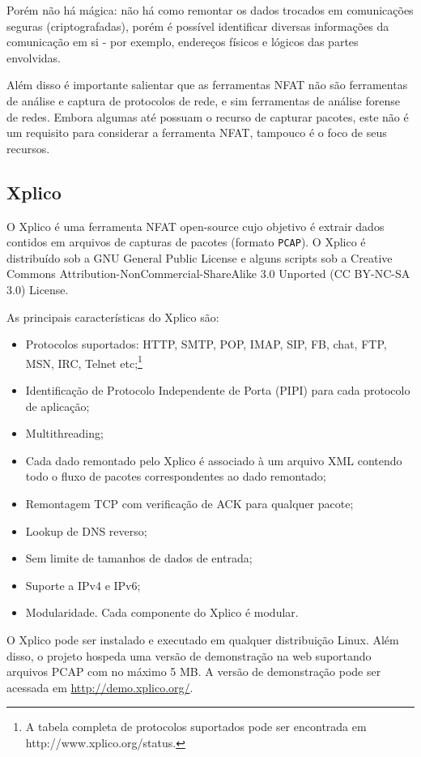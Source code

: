 \documentclass[12pt]{article}
\begin{document}
Porém não há mágica: não há como remontar os dados trocados em comunicações seguras (criptografadas), porém é possível identificar diversas informações da comunicação em si - por exemplo, endereços físicos e lógicos das partes envolvidas.

Além disso é importante salientar que as ferramentas NFAT não são ferramentas de análise e captura de protocolos de rede, e sim ferramentas de análise forense de redes. Embora algumas até possuam o recurso de capturar pacotes, este não é um requisito para considerar a ferramenta NFAT, tampouco é o foco de seus recursos.

\subsection{Xplico}

O Xplico é uma ferramenta NFAT open-source cujo objetivo é extrair dados contidos em arquivos de capturas de pacotes (formato \texttt{PCAP}). O Xplico é distribuído sob a GNU General Public License e alguns scripts sob a Creative Commons Attribution-NonCommercial-ShareAlike 3.0 Unported (CC BY-NC-SA 3.0) License.

As principais características do Xplico são:

\begin{itemize}
  \item Protocolos suportados: HTTP, SMTP, POP, IMAP, SIP, FB, chat, FTP, MSN, IRC, Telnet etc;\footnote{A tabela completa de protocolos suportados pode ser encontrada em http://www.xplico.org/status.}
  \item Identificação de Protocolo Independente de Porta (PIPI) para cada protocolo de aplicação;
  \item Multithreading;
  \item Cada dado remontado pelo Xplico é associado à um arquivo XML contendo todo o fluxo de pacotes correspondentes ao dado remontado;
  \item Remontagem TCP com verificação de ACK para qualquer pacote;
  \item Lookup de DNS reverso;
  \item Sem limite de tamanhos de dados de entrada;
  \item Suporte a IPv4 e IPv6;
  \item Modularidade. Cada componente do Xplico é modular.
\end{itemize}

O Xplico pode ser instalado e executado em qualquer distribuição Linux. Além disso, o projeto hospeda uma versão de demonstração na web suportando arquivos PCAP com no máximo 5 MB. A versão de demonstração pode ser acessada em \href{http://demo.xplico.org/}{http://demo.xplico.org/}.
\end{document}
